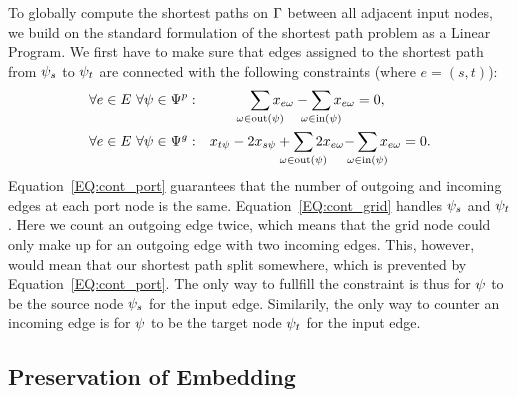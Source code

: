 \documentclass{sig-alternate-sigmod09}
\begin{document}
To globally compute the shortest paths on $\Gamma$ between all adjacent input nodes, we build on the standard formulation of the shortest path problem as a Linear Program.
We first have to make sure that edges assigned to the shortest path from $\psi_s$ to $\psi_t$ are connected with the following constraints (where $e = (s, t)$):
%
\newcommand\Psum[1]{\sum_{\makebox[0pt]{$\scriptstyle#1$}}}
%
\begin{align}
	&\forall \ie \in \iE\ \forall \gv \in \gV^p:& \Psum{\ge \in \text{out}(\gv)} \geused{\ie}{\ge} - \Psum{\ge \in \text{in}(\gv)} \geused{\ie}{\ge}& = 0, \label{EQ:cont_port} \\
	&\forall \ie \in \iE\ \forall \gv \in \gV^g:& x_{t\psi} - 2x_{s\psi} + \Psum{\ge \in \text{out}(\gv)} 2\geused{\ie}{\ge} - &\Psum{\ge \in \text{in}(\gv)} \geused{\ie}{\ge} = 0. \label{EQ:cont_grid}
\end{align}
%
Equation~\ref{EQ:cont_port} guarantees that the number of outgoing and incoming edges at each port node is the same.
%
Equation~\ref{EQ:cont_grid} handles $\psi_s$ and $\psi_t$.
Here we count an outgoing edge twice, which means that the grid node could only make up for an outgoing edge with two incoming edges.
This, however, would mean that our shortest path split somewhere, which is prevented by Equation~\ref{EQ:cont_port}.
The only way to fullfill the constraint is thus for $\psi$ to be the source node $\psi_s$ for the input edge.
Similarily, the only way to counter an incoming edge is for $\psi$ to be the target node $\psi_t$ for the input edge.

\subsection{Preservation of Embedding}
\end{document}
